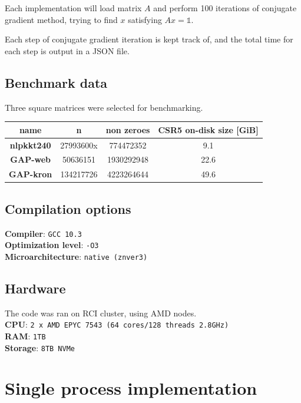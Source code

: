 \documentclass[thesis=M,english]{FITthesis}[2019/12/23]
\begin{document}
Each implementation will load matrix $A$ and perform 100 iterations of conjugate
gradient method, trying to find $x$ satisfying $Ax=\mathbb{1}$.

Each step of conjugate gradient iteration is kept track of, and the total time
for each step is output in a JSON file.

\subsection{Benchmark data}

Three square matrices were selected for benchmarking.

\begin{tabular}{|c|c|c|c|}
    \hline
    \textbf{name}      & \textbf{n} & \textbf{non zeroes} & \textbf{CSR5 on-disk size} [GiB] \\
    \hline
    \hline
    \textbf{nlpkkt240} & 27993600x  & 774472352           & 9.1                              \\
    \hline
    \textbf{GAP-web}   & 50636151   & 1930292948          & 22.6                             \\
    \hline
    \textbf{GAP-kron}  & 134217726  & 4223264644          & 49.6                             \\
    \hline
\end{tabular}


\subsection{Compilation options}

\textbf{Compiler}: \texttt{GCC 10.3} \\
\textbf{Optimization level}: \texttt{-O3} \\
\textbf{Microarchitecture}: \texttt{native (znver3)} \\


\subsection{Hardware}

The code was ran on RCI cluster, using AMD nodes.\\
\textbf{CPU}: \texttt{2 x AMD EPYC 7543 (64 cores/128 threads 2.8GHz)} \\
\textbf{RAM}: \texttt{1TB}\\
\textbf{Storage}: \texttt{8TB NVMe}


\section{Single process implementation}
\end{document}

